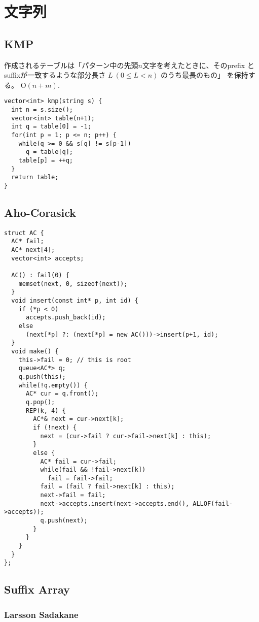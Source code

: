 \section{文字列}

\subsection{KMP}

作成されるテーブルは「パターン中の先頭$n$文字を考えたときに、そのprefix
とsuffixが一致するような部分長さ $L ~ (0 \leq L < n)$ のうち最長のもの」
を保持する。
$\mathrm{O}(n + m)$.

\begin{lstlisting}
vector<int> kmp(string s) {
  int n = s.size();
  vector<int> table(n+1);
  int q = table[0] = -1;
  for(int p = 1; p <= n; p++) {
    while(q >= 0 && s[q] != s[p-1])
      q = table[q];
    table[p] = ++q;
  }
  return table;
}
\end{lstlisting}


\subsection{Aho-Corasick}

\begin{lstlisting}
struct AC {
  AC* fail;
  AC* next[4];
  vector<int> accepts;
 
  AC() : fail(0) {
    memset(next, 0, sizeof(next));
  }
  void insert(const int* p, int id) {
    if (*p < 0)
      accepts.push_back(id);
    else
      (next[*p] ?: (next[*p] = new AC()))->insert(p+1, id);
  }
  void make() {
    this->fail = 0; // this is root
    queue<AC*> q;
    q.push(this);
    while(!q.empty()) {
      AC* cur = q.front();
      q.pop();
      REP(k, 4) {
        AC*& next = cur->next[k];
        if (!next) {
          next = (cur->fail ? cur->fail->next[k] : this);
        }
        else {
          AC* fail = cur->fail;
          while(fail && !fail->next[k])
            fail = fail->fail;
          fail = (fail ? fail->next[k] : this);
          next->fail = fail;
          next->accepts.insert(next->accepts.end(), ALLOF(fail->accepts));
          q.push(next);
        }
      }
    }
  }
};
\end{lstlisting}

\subsection{Suffix Array}

\subsubsection{Larsson Sadakane}

